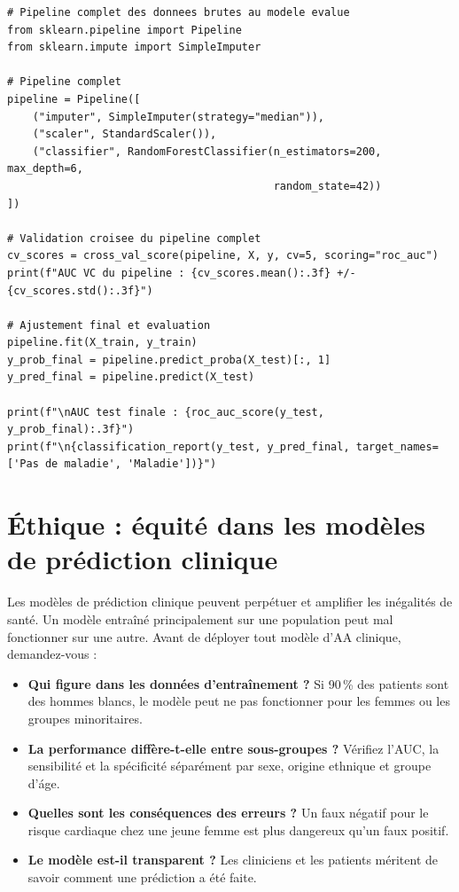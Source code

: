 \begin{verbatim}
# Pipeline complet des donnees brutes au modele evalue
from sklearn.pipeline import Pipeline
from sklearn.impute import SimpleImputer

# Pipeline complet
pipeline = Pipeline([
    ("imputer", SimpleImputer(strategy="median")),
    ("scaler", StandardScaler()),
    ("classifier", RandomForestClassifier(n_estimators=200, max_depth=6,
                                          random_state=42))
])

# Validation croisee du pipeline complet
cv_scores = cross_val_score(pipeline, X, y, cv=5, scoring="roc_auc")
print(f"AUC VC du pipeline : {cv_scores.mean():.3f} +/- {cv_scores.std():.3f}")

# Ajustement final et evaluation
pipeline.fit(X_train, y_train)
y_prob_final = pipeline.predict_proba(X_test)[:, 1]
y_pred_final = pipeline.predict(X_test)

print(f"\nAUC test finale : {roc_auc_score(y_test, y_prob_final):.3f}")
print(f"\n{classification_report(y_test, y_pred_final, target_names=['Pas de maladie', 'Maladie'])}")
\end{verbatim}

\section{\'Ethique : \'equit\'e dans les mod\`eles de pr\'ediction clinique}

\begin{warningbox}
Les mod\`eles de pr\'ediction clinique peuvent perp\'etuer et amplifier les in\'egalit\'es de sant\'e. Un mod\`ele entra\^in\'e principalement sur une population peut mal fonctionner sur une autre. Avant de d\'eployer tout mod\`ele d'AA clinique, demandez-vous :
\begin{itemize}
  \item \textbf{Qui figure dans les donn\'ees d'entra\^inement ?} Si 90\,\% des patients sont des hommes blancs, le mod\`ele peut ne pas fonctionner pour les femmes ou les groupes minoritaires.
  \item \textbf{La performance diff\`ere-t-elle entre sous-groupes ?} V\'erifiez l'AUC, la sensibilit\'e et la sp\'ecificit\'e s\'epar\'ement par sexe, origine ethnique et groupe d'\'age.
  \item \textbf{Quelles sont les cons\'equences des erreurs ?} Un faux n\'egatif pour le risque cardiaque chez une jeune femme est plus dangereux qu'un faux positif.
  \item \textbf{Le mod\`ele est-il transparent ?} Les cliniciens et les patients m\'eritent de savoir comment une pr\'ediction a \'et\'e faite.
\end{itemize}
\end{warningbox}

